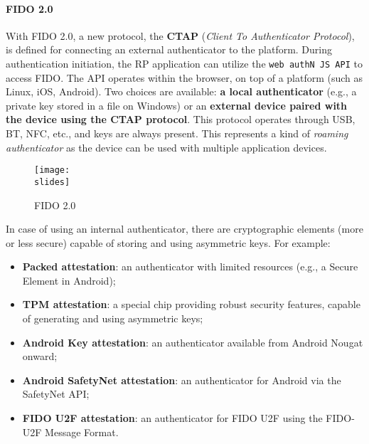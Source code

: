 \paragraph*{FIDO 2.0}

With FIDO 2.0, a new protocol, the \textbf{CTAP} (\textit{Client To Authenticator Protocol}), is defined for connecting an external authenticator to the platform. During authentication initiation, the RP application can utilize the \texttt{web authN JS API} to access FIDO. The API operates within the browser, on top of a platform (such as Linux, iOS, Android). Two choices are available: \textbf{a local authenticator} (e.g., a private key stored in a file on Windows) or an \textbf{external device paired with the device using the CTAP protocol}. This protocol operates through USB, BT, NFC, etc., and keys are always present. This represents a kind of \textit{roaming authenticator} as the device can be used with multiple application devices.


\begin{figure}[h]
  \centering
  \texttt{[image: \\slides]}
  \caption*{FIDO 2.0}
\end{figure}

In case of using an internal authenticator, there are cryptographic elements (more or less secure) capable of storing and using asymmetric keys.
For example:
\begin{itemize}
  \item \textbf{Packed attestation}: an authenticator with limited resources (e.g., a Secure Element in Android);
  \item \textbf{TPM attestation}: a special chip providing robust security features, capable of generating and using asymmetric keys;
  \item \textbf{Android Key attestation}: an authenticator available from Android Nougat onward;
  \item \textbf{Android SafetyNet attestation}: an authenticator for Android via the SafetyNet API;
  \item \textbf{FIDO U2F attestation}: an authenticator for FIDO U2F using the FIDO-U2F Message Format.
\end{itemize}
